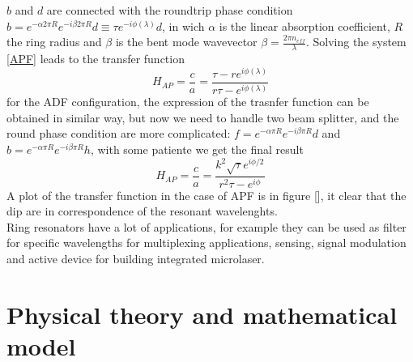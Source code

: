 \documentclass[12pt]{book}
\begin{document}
$b$ and $d$ are connected with the roundtrip phase condition $b = e^{-\alpha 2\pi R} e^{-i\beta 2\pi R}d \equiv\tau e^{-i\phi(\lambda)}d $, in wich $\alpha$ is the linear absorption coefficient, $R$ the ring radius and $\beta$ is the bent mode wavevector $\beta = \frac{2\pi n_{eff}}{\lambda}$. Solving the system \eqref{APF} leads to the transfer function
\[H_{AP} = \frac{c}{a} = \frac{\tau - re^{i\phi(\lambda)}}{r\tau -e^{i\phi(\lambda)}}\]
for the ADF configuration, the expression of the trasnfer function can be obtained in similar way, but now we need to handle two beam splitter, and the round phase condition are more complicated: $f = e^{-\alpha \pi R} e^{-i\beta \pi R}d$ and $b=e^{-\alpha \pi R} e^{-i\beta \pi R}h$, with some patiente we get the final result
\[H_{AP} = \frac{c}{a} = \frac{k^2\sqrt{\tau} e^{i\phi/2}}{r^2\tau -e^{i\phi}}\]
A plot of the transfer function in the case of APF is in figure [], it clear that the dip are in correspondence of the resonant wavelenghts.\\
Ring resonators have a lot of applications, for example they can be used as filter for specific wavelengths for multiplexing applications, sensing, signal modulation and active device for building integrated microlaser.  



\chapter{Physical theory and mathematical model}
\end{document}
